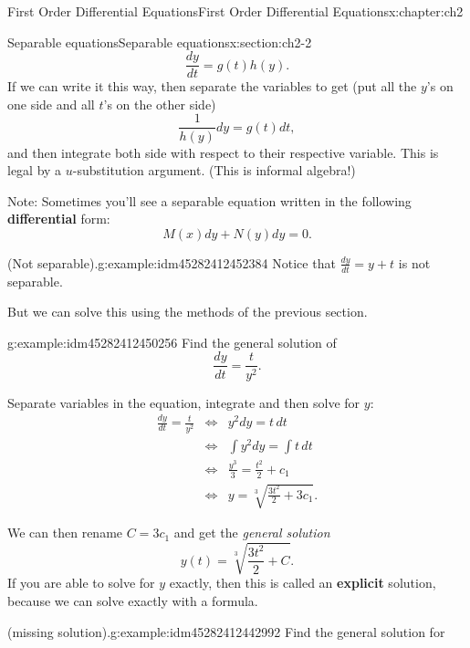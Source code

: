\documentclass[oneside,10pt,]{book}
\newcommand{\terminology}[1]{\textbf{#1}}
\numberwithin{equation}{section}
\numberwithin{equation}{section}
\newcommand{\amp}{&}
\begin{document}
\begin{chapterptx}{First Order Differential Equations}{}{First Order Differential Equations}{}{}{x:chapter:ch2}
\begin{sectionptx}{Separable equations}{}{Separable equations}{}{}{x:section:ch2-2}
\begin{equation}
\frac{dy}{dt}=g(t)h(y).\label{x:men:sepeqn}
\end{equation}
If we can write it this way, then separate the variables to get (put all the \(y\)'s on one side and all \(t\)'s on the other side)%
\begin{equation*}
\frac{1}{h(y)}dy=g(t)dt,
\end{equation*}
and then integrate both side with respect to their respective variable. This is legal by a \(u\)-substitution argument. (This is informal algebra!)%
\par
Note: Sometimes you'll see a separable equation written in the following \terminology{differential} form:%
\begin{equation*}
M(x)dy+N(y)dy=0.
\end{equation*}
%
\begin{example}{(Not separable).}{g:example:idm45282412452384}%
Notice that \(\frac{dy}{dt}=y+t\) is not separable.%
\par
But we can solve this using the methods of the previous section.%
\end{example}
\begin{example}{}{g:example:idm45282412450256}%
Find the general solution of%
\begin{equation*}
\frac{dy}{dt}=\frac{t}{y^{2}}.
\end{equation*}
%
\par
Separate variables in the equation, integrate and then solve for \(y\):%
\begin{align*}
\frac{dy}{dt}=\frac{t}{y^{2}} \amp \iff \amp y^{2}dy=t\,dt\\
\amp \iff \amp \int y^{2}dy=\int t\,dt\\
\amp \iff \amp \frac{y^{3}}{3}=\frac{t^{2}}{2}+c_{1}\\
\amp \iff \amp y=\sqrt[3]{\frac{3t^{2}}{2}+3c_{1}}.
\end{align*}
%
\par
We can then rename \(C=3c_{1}\) and get the \emph{general solution}%
\begin{equation*}
y(t)=\sqrt[3]{\frac{3t^{2}}{2}+C}.
\end{equation*}
If you are able to solve for \(y\) exactly, then this is called an \terminology{explicit} solution, because we can solve exactly with a formula.%
\end{example}
\begin{example}{(missing solution).}{g:example:idm45282412442992}%
Find the general solution for%

\end{example}
\end{sectionptx}
\end{chapterptx}
\end{document}
